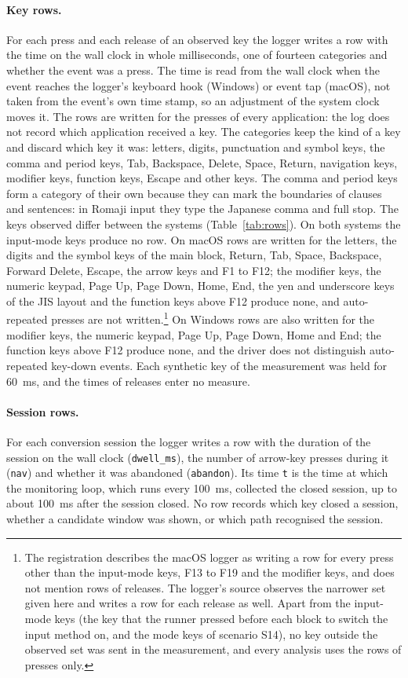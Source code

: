 \paragraph{Key rows.} For each press and each release of an observed key the logger writes a row with the time on
the wall clock in whole milliseconds, one of fourteen categories and whether the event was a press. The time is read
from the wall clock when the event reaches the logger's keyboard hook (Windows) or event tap (macOS), not taken from the
event's own time stamp, so an adjustment of the system clock moves it. The rows are written for the presses of every
application: the log does not record which application received a key. The categories
keep the kind of a key and discard which key it was: letters, digits, punctuation and symbol keys, the comma and
period keys, Tab, Backspace, Delete, Space, Return, navigation keys, modifier keys, function keys, Escape and other
keys. The comma and period keys form a category of their own because they can mark the boundaries of clauses and
sentences: in Romaji input they type the Japanese comma and full stop. The keys observed differ between the systems (Table~\ref{tab:rows}). On both systems the input-mode keys
produce no row. On macOS rows are written for the letters, the digits and the symbol keys of the main block, Return,
Tab, Space, Backspace, Forward Delete, Escape, the arrow keys and F1 to F12; the modifier keys, the numeric keypad,
Page Up, Page Down, Home, End, the yen and underscore keys of the JIS layout and the function keys above F12 produce
none, and auto-repeated presses are not written.\footnote{The registration describes the macOS logger as writing a row
for every press other than the input-mode keys, F13 to F19 and the modifier keys, and does not mention rows of
releases.
The logger's source observes the narrower set given here and writes a row for each release as well. Apart from the
input-mode keys (the key that the runner pressed before each block to switch the input method on, and the mode keys
of scenario S14), no key outside the observed set was sent in the measurement, and every analysis uses the rows of
presses only.} On Windows rows are
also written for the modifier keys, the numeric keypad, Page Up, Page Down, Home and End; the function keys above F12
produce none, and the driver does not distinguish auto-repeated key-down events. Each synthetic key of the measurement
was held for 60~ms, and the times of releases enter no measure.

\paragraph{Session rows.} For each conversion session the logger writes a row with the duration of the session on
the wall clock (\texttt{dwell\_ms}), the number of arrow-key presses during it (\texttt{nav}) and whether it was
abandoned (\texttt{abandon}). Its time \texttt{t} is the time at which the monitoring loop, which runs every 100~ms,
collected the closed session, up to about 100~ms after the session closed. No row records which key closed a session,
whether a candidate window was shown, or which path recognised the session.

